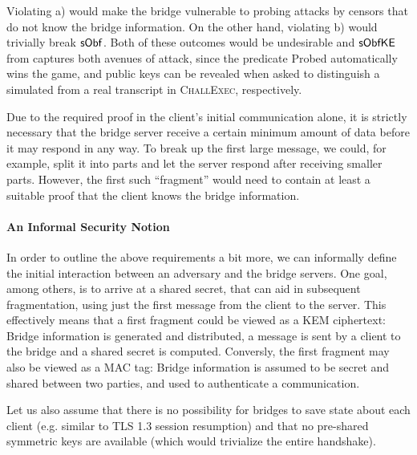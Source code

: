 Violating a) would make the bridge vulnerable to probing attacks by censors that do not know the bridge information. On the other hand, violating b) would trivially break $\mathsf{sObf}$. Both of these outcomes would be undesirable and $\mathsf{sObfKE}$ from \cite{CCS:GunSteVei24} captures both avenues of attack, since the predicate \textsf{Probed} automatically wins the game, and public keys can be revealed when asked to distinguish a simulated from a real transcript in \textsc{ChallExec}, respectively.

Due to the required proof in the client's initial communication alone, it is strictly necessary that the bridge server receive a certain minimum amount of data before it may respond in any way.
To break up the first large \drivel{} message, we could, for example, split it into parts and let the server respond after receiving smaller parts. However, the first such ``fragment'' would need to contain at least a suitable proof that the client knows the bridge information.

\paragraph{An Informal Security Notion}
In order to outline the above requirements a bit more, we can informally define the initial interaction between an adversary and the bridge servers. One goal, among others, is to arrive at a shared secret, that can aid in subsequent fragmentation, using just the first message from the client to the server.
This effectively means that a first fragment could be viewed as a KEM ciphertext: Bridge information is generated and distributed, a message is sent by a client to the bridge and a shared secret is computed. Conversly, the first fragment may also be viewed as a MAC tag: Bridge information is assumed to be secret and shared between two parties, and used to authenticate a communication.

Let us also assume that there is no possibility for bridges to save state about each client (e.g. similar to TLS 1.3 session resumption) and that no pre-shared symmetric keys are available (which would trivialize the entire handshake).

